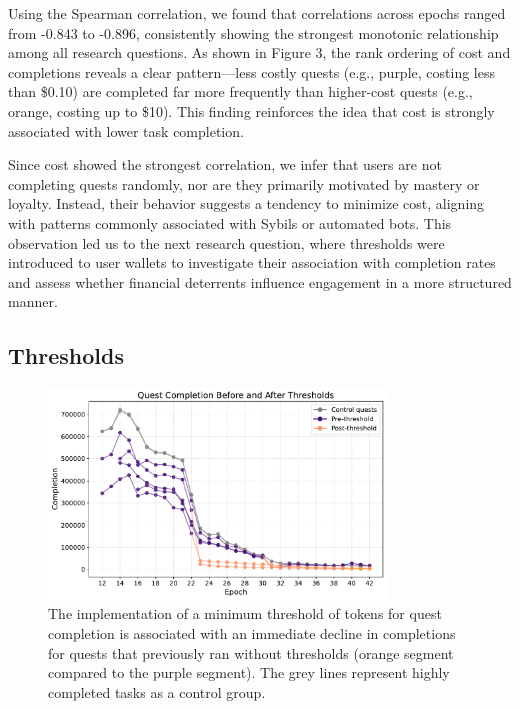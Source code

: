 Using the Spearman correlation, we found that correlations across epochs ranged from -0.843 to -0.896, consistently showing the strongest monotonic relationship among all research questions.
As shown in Figure 3, the rank ordering of cost and completions reveals a clear pattern—less costly quests (e.g., purple, costing less than \$0.10) are completed far more frequently than higher-cost quests (e.g., orange, costing up to \$10). This finding reinforces the idea that cost is strongly associated with lower task completion.

Since cost showed the strongest correlation, we infer that users are not completing quests randomly, nor are they primarily motivated by mastery or loyalty. Instead, their behavior suggests a tendency to minimize cost, aligning with patterns commonly associated with Sybils or automated bots. This observation led us to the next research question, where thresholds were introduced to user wallets to investigate their association with completion rates and assess whether financial deterrents influence engagement in a more structured manner. 



\subsection{Thresholds}
\label{sec:thresh}

\begin{figure}[t]
    \centering
    \includegraphics[width=0.8\textwidth]{figures/threshold.pdf}
    \caption{The implementation of a minimum threshold of tokens for quest completion is associated with an immediate decline in completions for quests that previously ran without thresholds (orange segment compared to the purple segment). The grey lines represent highly completed tasks as a control group.\label{fig:threshold}}
\end{figure}

